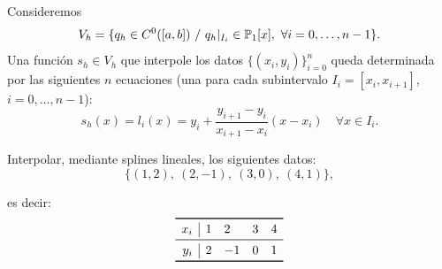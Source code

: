 Consideremos
\begin{equation*}
  V_h = \{q_h \in C^{0}([a,b])\ / \ q_h|_{I_i}\in  \operatorname{{\mathbb P}}_1[x],\ \forall i=0,\dots,n-1\}.
\end{equation*}
Una función $s_h\in V_h$ que interpole los datos
$\{(x_i,y_i)\}_{i=0}^n$ queda determinada por las siguientes $n$
ecuaciones (una para cada subintervalo $I_i=[x_i, x_{i+1}]$,
$i=0,\dots,n-1$):
\begin{equation*}
  \label{eq:splines-lineales-1}
  s_h(x) = l_i(x) = y_i + \frac{y_{i+1}-y_i}{x_{i+1}-x_i}(x-x_i) \quad
  \forall x\in I_i.
\end{equation*}

\begin{example}
  \label{ex:splines-lineales-1}
  Interpolar, mediante splines lineales, los siguientes
  datos:
  \begin{equation*}
    \{ (1,2),\ (2,-1),\ (3,0),\ (4,1) \},
  \end{equation*}
\end{example}
es decir:
\begin{equation*}
  \begin{array}{r|lllcl}
    \toprule
    x_i & 1 & 2 & 3 & 4
    \\ \midrule
    y_i & 2 & -1 & 0  & 1
    \\
    \bottomrule
  \end{array}
  \label{eq:tabla-datos-lagrange}
\end{equation*}

